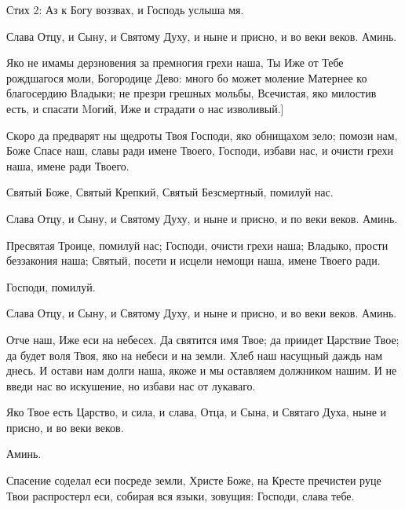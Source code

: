 \begin{mymulticols}
Стих 2: Аз к Богу воззвах, и Господь услыша мя.



Слава Отцу, и Сыну, и Святому Духу, и ныне и присно, и во веки веков. Аминь.

 Яко не имамы дерзновения за премногия грехи наша, Ты Иже от Тебе рождшагося моли, Богородице Дево: много бо может моление Матернее ко благосердию Владыки; не презри грешных мольбы, Всечистая, яко милостив есть, и спасати Mогий, Иже и страдати о нас изволивый.]





Скоро да предварят ны щедроты Твоя Господи, яко обнищахом зело; помози нам, Боже Спасе наш, славы ради имене Твоего, Господи, избави нас, и очисти грехи наша, имене ради Твоего.



Святый Боже, Святый Крепкий, Святый Безсмертный, помилуй нас.

Слава Отцу, и Сыну, и Святому Духу, и ныне и присно, и по веки веков. Аминь.



Пресвятая Троице, помилуй нас; Господи, очисти грехи наша; Владыко, прости беззакония наша; Святый, посети и исцели немощи наша, имене Твоего ради.



Господи, помилуй.

Слава Отцу, и Сыну, и Святому Духу, и ныне и присно, и во веки веков. Аминь.

Отче наш, Иже еси на небесех. Да святится имя Твое; да приидет Царствие Твое; да будет воля Твоя, яко на небеси и на земли. Хлеб наш насущный даждь нам днесь. И остави нам долги наша, якоже и мы оставляем должником нашим. И не введи нас во искушение, но избави нас от лукаваго.

 Яко Твое есть Царство, и сила, и слава, Отца, и Сына, и Святаго Духа, ныне и присно, и во веки веков.

 Аминь.






\myemph{ [Если Великий пост "--- тропари, глас 2:}

Спасение соделал еси посреде земли, Христе Боже, на Кресте пречистеи руце Твои распростерл еси, собирая вся языки, зовущия: Господи, слава тебе.




\end{mymulticols}
